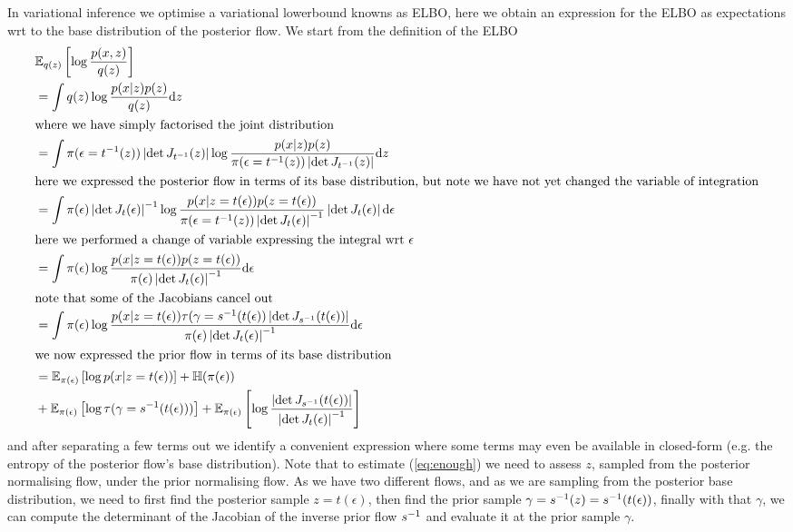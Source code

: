 In variational inference we optimise a variational lowerbound knowns as ELBO, here we obtain an expression for the ELBO as expectations wrt to the base distribution of the posterior flow.
We start from the definition of the ELBO
\begin{subequations}
\begin{align}
    & \mathbb E_{q(z)}\left[ \log \frac{p(x,z)}{q(z)} \right] \\
    &= \int q(z) \log \frac{p(x|z)p(z)}{q(z)} \dd z \\
    \intertext{where we have simply factorised the joint distribution}
    &= \int \pi(\epsilon = {t}^{-1}(z)) \left| \det J_{{t}^{-1}}(z) \right| \log \frac{p(x|z)p(z)}{\pi(\epsilon = {t}^{-1}(z)) \left| \det J_{{t}^{-1}}(z) \right|} \dd z \\
    \intertext{here we expressed the posterior flow in terms of its base distribution, but note we have not yet changed the variable of integration}
    &= \int \pi(\epsilon) \left| \det J_{t}(\epsilon) \right|^{-1} \log \frac{p(x|z=t(\epsilon))p(z=t(\epsilon))}{\pi(\epsilon = {t}^{-1}(z)) \left| \det J_{t}(\epsilon) \right|^{-1}} \left| \det J_{t}(\epsilon) \right| \dd \epsilon \\
    \intertext{here we performed a change of variable expressing the integral wrt $\epsilon$}
    &=  \int \pi(\epsilon) \log \frac{p(x|z=t(\epsilon))p(z=t(\epsilon))}{\pi(\epsilon) \left| \det J_{t}(\epsilon) \right|^{-1}} \dd \epsilon  \\ 
    \intertext{note that some of the Jacobians cancel out}
    &=  \int \pi(\epsilon) \log \frac{p(x|z=t(\epsilon))\tau(\gamma ={s}^{-1}(t(\epsilon))\left| \det J_{{s}^{-1}}(t(\epsilon)) \right| }{\pi(\epsilon) \left| \det J_{t}(\epsilon) \right|^{-1}} \dd \epsilon \label{eq:enough}\\
    \intertext{we now expressed the prior flow in terms of its base distribution}
    &= \mathbb E_{\pi(\epsilon)}\left[ \log p(x|z=t(\epsilon))\right] + \mathbb H(\pi(\epsilon)) \\
    &+ \mathbb E_{\pi(\epsilon)}\left[ \log \tau(\gamma = {s}^{-1}(t(\epsilon))) \right] + \mathbb E_{\pi(\epsilon)}\left[ \log \frac{\left| \det J_{{s}^{-1}}(t(\epsilon)) \right|}{\left| \det J_{t}(\epsilon) \right|^{-1}} \right]
\end{align}
\end{subequations}
and after separating a few terms out we identify a convenient expression where some terms may even be available in closed-form (e.g. the entropy of the posterior flow's base distribution).
Note that to estimate (\ref{eq:enough}) we need to assess $z$, sampled from the posterior normalising flow, under the prior normalising flow. As we have two different flows, and as we are sampling from the posterior base distribution, we need to first find the posterior sample $z = t(\epsilon)$, then find the prior sample $\gamma = {s}^{-1}(z) = {s}^{-1}(t(\epsilon))$, finally with that $\gamma$, we can compute the determinant of the Jacobian of the inverse prior flow ${s}^{-1}$ and evaluate it at the prior sample $\gamma$. 